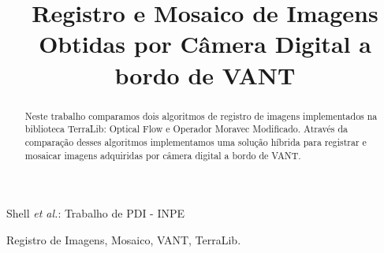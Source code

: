 \documentclass[9pt, a4paper, nofonttune, journal]{IEEEtran}
\begin{document}
\title{Registro e Mosaico de Imagens \\Obtidas por Câmera Digital a bordo de VANT}

\author{
}

%
{Shell \MakeLowercase{\textit{et al.}}: Trabalho de PDI - INPE}

\maketitle               
\renewcommand\abstractname{Resumo}
\renewcommand{\refname}{Referências}
\renewcommand\IEEEkeywordsname{Palavras-chave}


\begin{abstract}
Neste trabalho comparamos dois algoritmos de registro de imagens implementados na biblioteca TerraLib: Optical Flow e Operador Moravec Modificado. Através da comparação desses algoritmos implementamos uma solução híbrida para registrar e mosaicar imagens adquiridas por câmera digital a bordo de VANT.
\end{abstract}

\begin{IEEEkeywords}
Registro de Imagens, Mosaico, VANT, TerraLib.
\end{IEEEkeywords}
\end{document}
